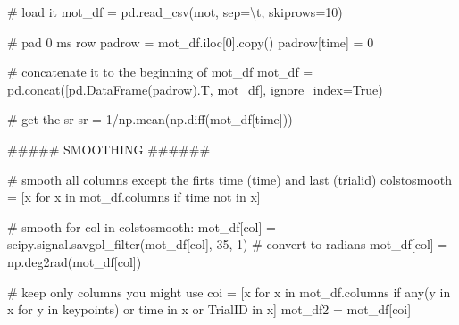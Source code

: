 \documentclass[
  letterpaper,
  DIV=11,
  numbers=noendperiod]{scrreprt}
\newenvironment{Shaded}{\begin{snugshade}}{\end{snugshade}}
\newcommand{\BuiltInTok}[1]{\textcolor[rgb]{0.00,0.23,0.31}{#1}}
\newcommand{\CharTok}[1]{\textcolor[rgb]{0.13,0.47,0.30}{#1}}
\newcommand{\CommentTok}[1]{\textcolor[rgb]{0.37,0.37,0.37}{#1}}
\newcommand{\ControlFlowTok}[1]{\textcolor[rgb]{0.00,0.23,0.31}{#1}}
\newcommand{\DecValTok}[1]{\textcolor[rgb]{0.68,0.00,0.00}{#1}}
\newcommand{\KeywordTok}[1]{\textcolor[rgb]{0.00,0.23,0.31}{#1}}
\newcommand{\NormalTok}[1]{\textcolor[rgb]{0.00,0.23,0.31}{#1}}
\newcommand{\OperatorTok}[1]{\textcolor[rgb]{0.37,0.37,0.37}{#1}}
\newcommand{\StringTok}[1]{\textcolor[rgb]{0.13,0.47,0.30}{#1}}
\newcommand{\VariableTok}[1]{\textcolor[rgb]{0.07,0.07,0.07}{#1}}
\begin{document}
\begin{Shaded}
\begin{Highlighting}[]
    \CommentTok{\# load it}
\NormalTok{    mot\_df }\OperatorTok{=}\NormalTok{ pd.read\_csv(mot, sep}\OperatorTok{=}\StringTok{\textquotesingle{}}\CharTok{\textbackslash{}t}\StringTok{\textquotesingle{}}\NormalTok{, skiprows}\OperatorTok{=}\DecValTok{10}\NormalTok{)}
    
    \CommentTok{\# pad 0 ms row}
\NormalTok{    padrow }\OperatorTok{=}\NormalTok{ mot\_df.iloc[}\DecValTok{0}\NormalTok{].copy()}
\NormalTok{    padrow[}\StringTok{\textquotesingle{}time\textquotesingle{}}\NormalTok{] }\OperatorTok{=} \DecValTok{0}

    \CommentTok{\# concatenate it to the beginning of mot\_df}
\NormalTok{    mot\_df }\OperatorTok{=}\NormalTok{ pd.concat([pd.DataFrame(padrow).T, mot\_df], ignore\_index}\OperatorTok{=}\VariableTok{True}\NormalTok{)}
    
    \CommentTok{\# get the sr}
\NormalTok{    sr }\OperatorTok{=} \DecValTok{1}\OperatorTok{/}\NormalTok{np.mean(np.diff(mot\_df[}\StringTok{\textquotesingle{}time\textquotesingle{}}\NormalTok{]))}

    \CommentTok{\#\#\#\#\# SMOOTHING \#\#\#\#\#\#}

    \CommentTok{\# smooth all columns except the firts time (time) and last (trialid)}
\NormalTok{    colstosmooth }\OperatorTok{=}\NormalTok{ [x }\ControlFlowTok{for}\NormalTok{ x }\KeywordTok{in}\NormalTok{ mot\_df.columns }\ControlFlowTok{if} \StringTok{\textquotesingle{}time\textquotesingle{}} \KeywordTok{not} \KeywordTok{in}\NormalTok{ x]}

    \CommentTok{\# smooth}
    \ControlFlowTok{for}\NormalTok{ col }\KeywordTok{in}\NormalTok{ colstosmooth:}
\NormalTok{        mot\_df[col] }\OperatorTok{=}\NormalTok{ scipy.signal.savgol\_filter(mot\_df[col], }\DecValTok{35}\NormalTok{, }\DecValTok{1}\NormalTok{)}
        \CommentTok{\# convert to radians}
\NormalTok{        mot\_df[col] }\OperatorTok{=}\NormalTok{ np.deg2rad(mot\_df[col])}

    \CommentTok{\# keep only columns you might use}
\NormalTok{    coi }\OperatorTok{=}\NormalTok{ [x }\ControlFlowTok{for}\NormalTok{ x }\KeywordTok{in}\NormalTok{ mot\_df.columns }\ControlFlowTok{if} \BuiltInTok{any}\NormalTok{(y }\KeywordTok{in}\NormalTok{ x }\ControlFlowTok{for}\NormalTok{ y }\KeywordTok{in}\NormalTok{ keypoints) }\KeywordTok{or} \StringTok{\textquotesingle{}time\textquotesingle{}} \KeywordTok{in}\NormalTok{ x }\KeywordTok{or} \StringTok{\textquotesingle{}TrialID\textquotesingle{}} \KeywordTok{in}\NormalTok{ x]}
\NormalTok{    mot\_df2 }\OperatorTok{=}\NormalTok{ mot\_df[coi]}


\end{Highlighting}
\end{Shaded}
\end{document}
